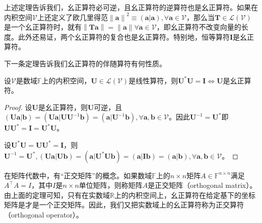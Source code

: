 \documentclass[main.tex]{subfiles}
\begin{document}
上述定理告诉我们，幺正算符必可逆，且幺正算符的逆算符也是幺正算符。如果在内积空间$\mathcal{V}$上还定义了欧几里得范$\left\|\mathbf{a}\right\|^2\equiv\left(\mathbf{a}|\mathbf{a}\right),\forall\mathbf{a}\in\mathcal{V}$，那么当$\mathbf{T}\in\mathcal{L}\left(\mathcal{V}\right)$是一个幺正算符时，就有$\left\|\mathbf{Ta}\right\|=\left\|\mathbf{a}\right\|\forall\mathbf{a}\in\mathcal{V}$，即幺正算符不改变向量的长度。此外还易证，两个幺正算符的复合也是幺正算符。特别地，恒等算符$\mathbf{I}$是幺正算符。

下一条定理告诉我们幺正算符的伴随算符有何性质。

\begin{theorem}\label{thm:II.6.4}
    设$\mathcal{V}$是数域$\mathbb{F}$上的内积空间，$\mathbf{U}\in\mathcal{L}\left(\mathcal{V}\right)$是线性算符，则$\mathbf{U}^*\mathbf{U}=\mathbf{I}\Leftrightarrow\mathbf{U}$是幺正算符。
\end{theorem}
\begin{proof}
    设$\mathbf{U}$是幺正算符，则$\mathbf{U}$可逆，且$\left(\mathbf{Ua}|\mathbf{b}\right)=\left(\mathbf{Ua}|\mathbf{UU}^{-1}\mathbf{b}\right)=\left(\mathbf{a}|\mathbf{U}^{-1}\mathbf{b}\right),\forall\mathbf{a},\mathbf{b}\in\mathcal{V}$。因此$\mathbf{U}^{-1}=\mathbf{U}^*$即$\mathbf{UU}^*=\mathbf{I}=\mathbf{U}^*\mathbf{U}$。

    设$\mathbf{U}^*\mathbf{U}=\mathbf{UU}^*=\mathbf{I}$，则$\mathbf{U}^{-1}=\mathbf{U}^*,\left(\mathbf{Ua}|\mathbf{Ub}\right)=\left(\mathbf{a}|\mathbf{U}^*\mathbf{Ub}\right)=\left(\mathbf{a}|\mathbf{Ib}\right)=\left(\mathbf{a}|\mathbf{b}\right),\forall\mathbf{a},\mathbf{b}\in\mathcal{V}$。
\end{proof}

在矩阵代数中，有“正交矩阵”的概念。如果数域$\mathbb{F}$上的$n\times n$矩阵$A\in\mathbb{F}^{n\times n}$满足$A^\intercal A=I$，其中$I$是$n\times n$单位矩阵，则称矩阵$A$是正交矩阵（orthogonal matrix）。由上面的定理可知，只有在实数域$\mathbb{R}$上的内积空间上，幺正算符在给定基下的坐标矩阵是才是一个正交矩阵。因此，我们又把实数域上的幺正算符称为正交算符（orthogonal operator）。
\end{document}
